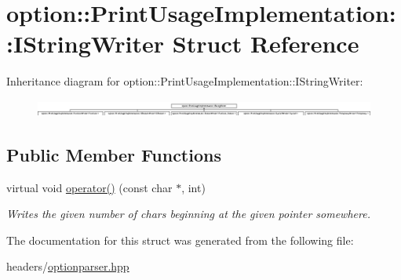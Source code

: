 \hypertarget{structoption_1_1PrintUsageImplementation_1_1IStringWriter}{}\section{option\+:\+:Print\+Usage\+Implementation\+:\+:I\+String\+Writer Struct Reference}
\label{structoption_1_1PrintUsageImplementation_1_1IStringWriter}
Inheritance diagram for option\+:\+:Print\+Usage\+Implementation\+:\+:I\+String\+Writer\+:\begin{figure}[H]
\begin{center}
\leavevmode
\includegraphics[height=0.555831cm]{structoption_1_1PrintUsageImplementation_1_1IStringWriter}
\end{center}
\end{figure}
\subsection*{Public Member Functions}
\begin{DoxyCompactItemize}
\item 
\mbox{\label{structoption_1_1PrintUsageImplementation_1_1IStringWriter_a497172d92e09072a16996c127dd3def8}} 
virtual void \hyperlink{structoption_1_1PrintUsageImplementation_1_1IStringWriter_a497172d92e09072a16996c127dd3def8}{operator()} (const char $\ast$, int)
\begin{DoxyCompactList}\small\item\em Writes the given number of chars beginning at the given pointer somewhere. \end{DoxyCompactList}\end{DoxyCompactItemize}


The documentation for this struct was generated from the following file\+:\begin{DoxyCompactItemize}
\item 
headers/\hyperlink{optionparser_8hpp}{optionparser.\+hpp}\end{DoxyCompactItemize}

